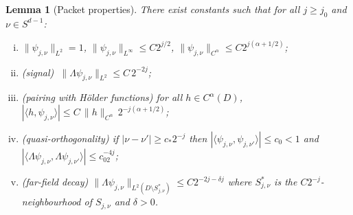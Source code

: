\documentclass[11pt]{amsart}
\newtheorem{lemma}[theorem]{Lemma}
\newcommand{\1}{\mathbf{1}}
\begin{document}
\begin{lemma}[Packet properties]\label{lem:packets}
There exist constants such that for all $j\ge j_0$ and
$\nu\in S^{d-1}$:
\begin{enumerate}[(i)]
\item $\|\psi_{j,\nu}\|_{L^2}=1$, $\|\psi_{j,\nu}\|_{L^\infty}\le C2^{j/2}$,
$\|\psi_{j,\nu}\|_{C^\alpha}\le C2^{j(\alpha+1/2)}$;
\item \label{it:signal}
(signal) $\ \|\Lambda\psi_{j,\nu}\|_{L^2}\le C\,2^{-2j}$;
\item \label{it:pair}
(pairing with H\"older functions) for all $h\in C^\alpha(D)$,
$|\langle h,\psi_{j,\nu}\rangle|\le C\,\|h\|_{C^\alpha}\,2^{-j(\alpha+1/2)}$;
\item \label{it:orth}
(quasi-orthogonality) if $|\nu-\nu'|\ge c_*2^{-j}$ then
$|\langle\psi_{j,\nu},\psi_{j,\nu'}\rangle|\le c_0<1$ and
$|\langle\Lambda\psi_{j,\nu},\Lambda\psi_{j,\nu'}\rangle|\le c_02^{-4j}$;
\item \label{it:loc}
(far-field decay) $\|\Lambda\psi_{j,\nu}\|_{L^2(D\setminus S^*_{j,\nu})}\le
C2^{-2j-\delta j}$ where $S^*_{j,\nu}$ is the $C2^{-j}$-neighbourhood of
$S_{j,\nu}$ and $\delta>0$.
\end{enumerate}
\end{lemma}
\end{document}
